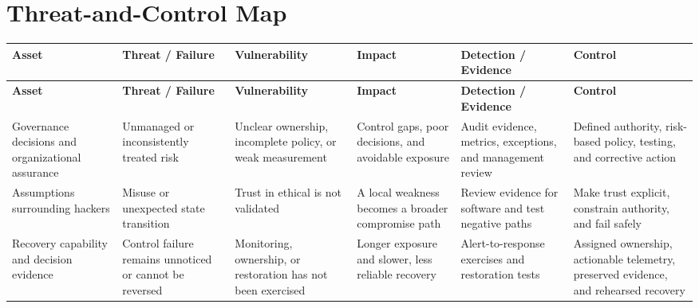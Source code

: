 \documentclass[11pt,letterpaper]{article}
\begin{document}
\section*{Threat-and-Control Map}
\begingroup\scriptsize\setlength{\tabcolsep}{2pt}
\begin{longtable}{>{\raggedright\arraybackslash}p{}>{\raggedright\arraybackslash}p{}>{\raggedright\arraybackslash}p{}>{\raggedright\arraybackslash}p{}>{\raggedright\arraybackslash}p{}>{\raggedright\arraybackslash}p{}}
\toprule\rowcolor{Navy}\color{white}\textbf{Asset} & \color{white}\textbf{Threat / Failure} & \color{white}\textbf{Vulnerability} & \color{white}\textbf{Impact} & \color{white}\textbf{Detection / Evidence} & \color{white}\textbf{Control}\\\midrule
\endfirsthead
\toprule\rowcolor{Navy}\color{white}\textbf{Asset} & \color{white}\textbf{Threat / Failure} & \color{white}\textbf{Vulnerability} & \color{white}\textbf{Impact} & \color{white}\textbf{Detection / Evidence} & \color{white}\textbf{Control}\\\midrule
\endhead
Governance decisions and organizational assurance & Unmanaged or inconsistently treated risk & Unclear ownership, incomplete policy, or weak measurement & Control gaps, poor decisions, and avoidable exposure & Audit evidence, metrics, exceptions, and management review & Defined authority, risk-based policy, testing, and corrective action\\\midrule
Assumptions surrounding hackers & Misuse or unexpected state transition & Trust in ethical is not validated & A local weakness becomes a broader compromise path & Review evidence for software and test negative paths & Make trust explicit, constrain authority, and fail safely\\\midrule
Recovery capability and decision evidence & Control failure remains unnoticed or cannot be reversed & Monitoring, ownership, or restoration has not been exercised & Longer exposure and slower, less reliable recovery & Alert-to-response exercises and restoration tests & Assigned ownership, actionable telemetry, preserved evidence, and rehearsed recovery\\\midrule
\bottomrule
\end{longtable}
\endgroup
\end{document}
